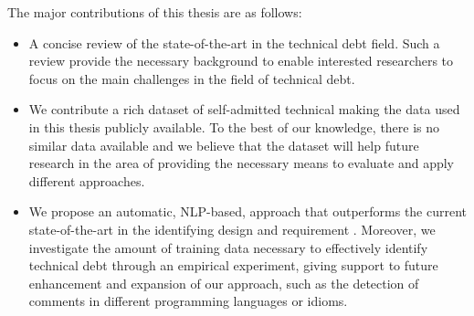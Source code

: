 The major contributions of this thesis are as follows:
\begin{itemize}

\item A concise review of the state-of-the-art in the technical debt field. Such a review provide the necessary background to enable interested researchers to focus on the main challenges in the field of technical debt. 

\item We contribute a rich dataset of self-admitted technical making the data used in this thesis publicly available. To the best of our knowledge, there is no similar data available and we believe that the dataset will help future research in the area of \SATD providing the necessary means to evaluate and apply different approaches.

\item We propose an automatic, NLP-based, approach that outperforms the current state-of-the-art in the identifying design and requirement \SATD. Moreover, we investigate the amount of training data necessary to effectively identify technical debt through an empirical experiment, giving support to future enhancement and expansion of our approach, such as the detection of \SATD comments in different programming languages or idioms.

\end{itemize}